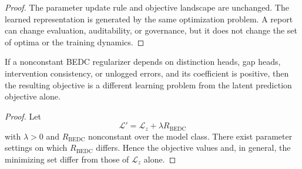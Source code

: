 \begin{proof}
The parameter update rule and objective landscape are unchanged.  The learned
representation is generated by the same optimization problem.  A report can
change evaluation, auditability, or governance, but it does not change the
set of optima or the training dynamics.
\end{proof}

\begin{proposition}
If a nonconstant BEDC regularizer depends on distinction heads, gap heads,
intervention consistency, or unlogged errors, and its coefficient is positive,
then the resulting objective is a different learning problem from the latent
prediction objective alone.
\end{proposition}

\begin{proof}
Let
$$
  \mathcal L'=\mathcal L_z+\lambda R_{\mathrm{BEDC}}
$$
with $\lambda>0$ and $R_{\mathrm{BEDC}}$ nonconstant over the model class.
There exist parameter settings on which $R_{\mathrm{BEDC}}$ differs.  Hence
the objective values and, in general, the minimizing set differ from those of
$\mathcal L_z$ alone.
\end{proof}

